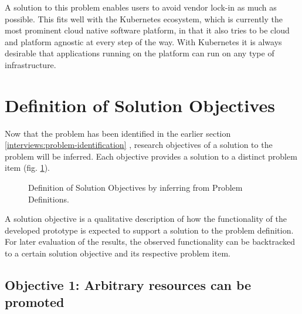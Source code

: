 A solution to this problem enables users to avoid vendor lock-in as much as possible.
This fits well with the Kubernetes ecosystem, which is currently the most prominent
cloud native software platform,
in that it also tries to be cloud and platform agnostic at every step of the way.
With Kubernetes it is always desirable that applications running on the platform can
run on any type of infrastructure.











\section{Definition of Solution Objectives}\label{interviews:definitionSolutionObjectives}

Now that the problem has been identified in the earlier section
\ref{interviews:problem-identification} ,
research objectives of a solution to the problem will be inferred.
Each objective provides a solution to a distinct problem item
(fig. \ref{fig:from-problem-to-objective-visualized}).

\begin{figure}[h]
	\centering
	\caption{Definition of Solution Objectives by inferring from Problem Definitions.
	}
	\label{fig:from-problem-to-objective-visualized}	
\end{figure}

A solution objective is a qualitative description of how the functionality
of the developed prototype is expected to support a solution to the problem definition.
For later evaluation of the results, the observed functionality can be backtracked to
a certain solution objective and its respective problem item.

\subsection{Objective 1: Arbitrary resources can be promoted}
\label{objective1}

